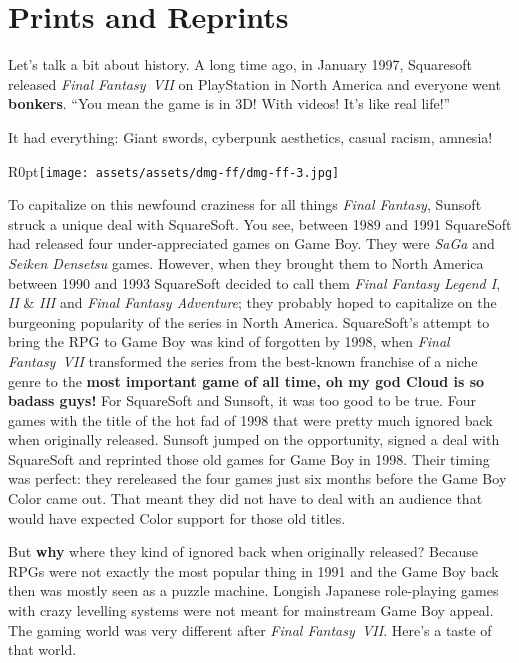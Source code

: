 \documentclass{book}
\begin{document}
\FloatBarrier\section*{Prints and Reprints}
Let’s talk a bit about history. A long time ago, in January 1997, Squaresoft released \emph{Final Fantasy~VII} on PlayStation in North America and everyone went \textbf{bonkers}. “You mean the game is in 3D! With videos! It’s like real life!”\par
It had everything: Giant swords, cyberpunk aesthetics, casual racism, amnesia!\par
\begin{wrapfigure}{R}{0pt}{\texttt{[image: assets/assets/dmg-ff/dmg-ff-3.jpg]}}\end{wrapfigure}
To capitalize on this newfound craziness for all things \emph{Final Fantasy}, Sunsoft struck a unique deal with SquareSoft. You see, between 1989 and 1991 SquareSoft had released four under-appreciated games on Game Boy. They were \emph{SaGa} and \emph{Seiken Densetsu} games. However, when they brought them to North America between 1990 and 1993 SquareSoft decided to call them \emph{Final Fantasy Legend I}, \emph{II} \& \emph{III} and \emph{Final Fantasy Adventure}; they probably hoped to capitalize on the burgeoning popularity of the series in North America. SquareSoft’s attempt to bring the RPG to Game Boy was kind of forgotten by 1998, when \emph{Final Fantasy~VII} transformed the series from the best-known franchise of a niche genre to the \textbf{most important game of all time, oh my god Cloud is so badass guys!} For SquareSoft and Sunsoft, it was too good to be true. Four games with the title of the hot fad of 1998 that were pretty much ignored back when originally released. Sunsoft jumped on the opportunity, signed a deal with SquareSoft and reprinted those old games for Game Boy in 1998. Their timing was perfect: they rereleased the four games just six months before the Game Boy Color came out. That meant they did not have to deal with an audience that would have expected Color support for those old titles.\par
But \textbf{why} where they kind of ignored back when originally released? Because RPGs were not exactly the most popular thing in 1991 and the Game Boy back then was mostly seen as a puzzle machine. Longish Japanese role-playing games with crazy levelling systems were not meant for mainstream Game Boy appeal. The gaming world was very different after \emph{Final Fantasy~VII}. Here’s a taste of that world.\par
\end{document}
